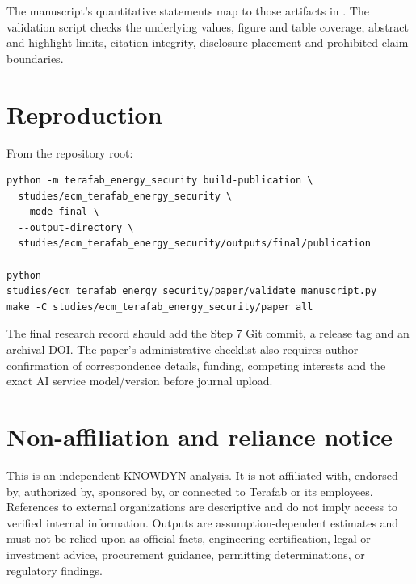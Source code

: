 \documentclass[11pt]{article}
\begin{document}
The manuscript's quantitative statements map to those artifacts in
. The validation script checks the
underlying values, figure and table coverage, abstract and highlight limits,
citation integrity, disclosure placement and prohibited-claim boundaries.

\section{Reproduction}

From the repository root:

\begin{verbatim}
python -m terafab_energy_security build-publication \
  studies/ecm_terafab_energy_security \
  --mode final \
  --output-directory \
  studies/ecm_terafab_energy_security/outputs/final/publication

python studies/ecm_terafab_energy_security/paper/validate_manuscript.py
make -C studies/ecm_terafab_energy_security/paper all
\end{verbatim}

The final research record should add the Step 7 Git commit, a release tag and
an archival DOI. The paper's administrative checklist also requires author
confirmation of correspondence details, funding, competing interests and the
exact AI service model/version before journal upload.

\section{Non-affiliation and reliance notice}

This is an independent KNOWDYN analysis. It is not affiliated with, endorsed
by, authorized by, sponsored by, or connected to Terafab or its employees.
References to external organizations are descriptive and do not imply access to
verified internal information. Outputs are assumption-dependent estimates and
must not be relied upon as official facts, engineering certification, legal or
investment advice, procurement guidance, permitting determinations, or
regulatory findings.
\end{document}
